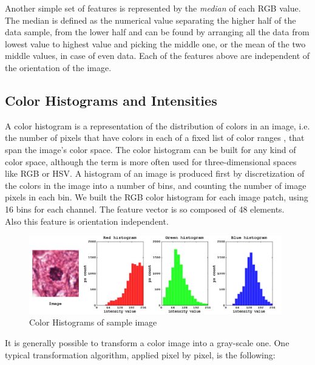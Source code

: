 Another simple set of features is represented by the \textit{median} of each \Gls{RGB} value. The median is defined as the numerical value separating the higher half of the data sample, from the lower half
and can be found by arranging all the data from lowest value to highest value and picking the middle one, or the mean of the two middle values, in case of even data.
Each of the features above are independent of the orientation of the image.



\vspace{0.5cm}

\subsection{Color Histograms and Intensities}
\label{ch4:chi}

A color histogram is a representation of the distribution of colors in an image, i.e. the number of pixels that have colors in each of a fixed list of color ranges \cite{colorHistogram01},
that span the image's color space. The color histogram can be built for any kind of color space, although the term is more often used for three-dimensional spaces like \Gls{RGB} or \Gls{HSV}.
A histogram of an image is produced first by discretization of the colors in the image into a number of bins, and counting the number of image pixels in each bin.
We built the \Gls{RGB} color histogram for each image patch, using 16 bins for each channel. The feature vector is so composed of 48 elements.\\
Also this feature is orientation independent.


\begin{figure}[!hbt]
  \centering
    \includegraphics[width=0.98\textwidth]{./images/histIM_mod1.png}
  \caption[Color Histograms]{Color Histograms of sample image}
  \label{ch4:fig2}
\end{figure}  

It is generally possible to transform a color image into a gray-scale one. One typical transformation algorithm, applied pixel by pixel, is the following:

